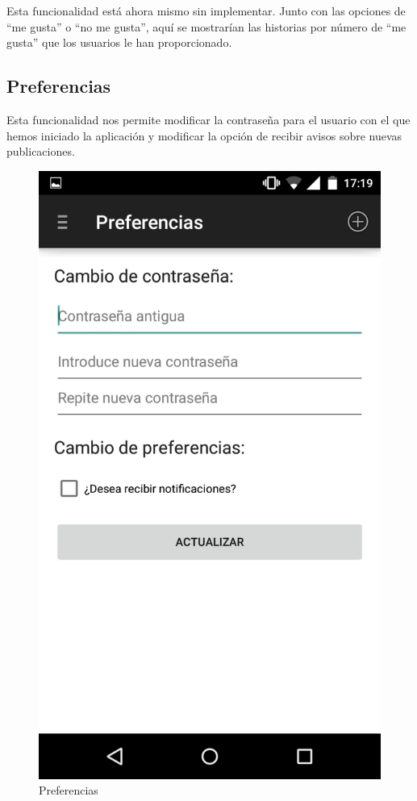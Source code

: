 \documentclass[11pt,a4paper, titlepage]{article}
\begin{document}
	Esta funcionalidad está ahora mismo sin implementar. Junto con las opciones de ``me gusta'' o ``no me gusta'', aquí se mostrarían las historias por número de ``me gusta'' que los usuarios le han proporcionado.
	
	\FloatBarrier
	\newpage
	\subsection[Preferencias]{Preferencias}
	
	Esta funcionalidad nos permite modificar la contraseña para el usuario con el que hemos iniciado la aplicación y modificar la opción de recibir avisos sobre nuevas publicaciones.
	
	\begin{figure}[hbtp]
		\centering
		\includegraphics[scale = 0.25 ]{img/9}
		\caption{Preferencias}
		\label{p16}
	\end{figure}
	
\end{document}
